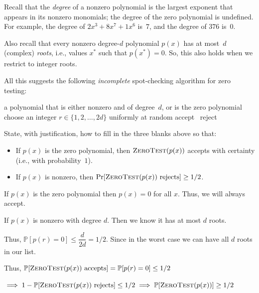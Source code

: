 \documentclass[12pt, letterpaper]{article}
\renewcommand{\P}{\mathbb{P}}
\renewcommand{\t}[1]{\text{#1}}
\begin{document}
\begin{subproblem}{}
    Recall that the \emph{degree} of a nonzero polynomial is the largest exponent that appears in its nonzero monomials; the degree of the zero polynomial is undefined.
    For example, the degree of $2x^3 + 8x^7 + 1x^6$ is~$7$, and the degree of $376$ is~$0$.

    Also recall that every nonzero degree-$d$ polynomial $p(x)$ has at most~$d$ (complex) \emph{roots}, i.e., values $x^*$ such that $p(x^*)=0$.
    So, this also holds when we restrict to integer roots.

    All this suggests the following \emph{incomplete} spot-checking algorithm for zero testing:

    \begin{minipage}{0.9\textwidth}
      \begin{algorithm}[H]
        \begin{algorithmic}[1]
          \Require a polynomial that is either nonzero and of degree~$d$, or is the zero polynomial
          \State choose an integer $r \in \{1,2,\ldots,2d\}$ uniformly at random
           accept
          \Else\ reject
          \EndIf
          \EndFunction
        \end{algorithmic}
      \end{algorithm}
    \end{minipage}
    
    State, with justification, how to fill in the three blanks above so that:
    \begin{itemize}
    \item If $p(x)$ is the zero polynomial, then $\Call{ZeroTest}{p(x)}$ accepts with certainty (i.e., with probability~$1$).
    \item If $p(x)$ is nonzero, then $\Pr[\Call{ZeroTest}{p(x)} \text{ rejects}] \geq 1/2$.
    \end{itemize}
\end{subproblem}
\begin{problemproof}
    If $p(x)$ is the zero polynomial then $p(x)=0$ for all $x$. Thus, we will always accept.

    If $p(x)$ is nonzero with degree $d$. Then we know it has at most $d$ roots. 
    
    Thus, $\P[p(r)=0] \leq \dfrac{d}{2d}=1/2$. Since in the worst case we can have all $d$ roots in our list.

    Thus, $\P[\Call{ZeroTest}{p(x)} \t{ accepts}]=\P[p(r)=0] \leq 1/2$ 
    
    $\implies 1-\P[\Call{ZeroTest}{p(x)} \t{ rejects}] \leq 1/2 \implies \P[\Call{ZeroTest}{p(x)}] \geq 1/2$
\end{problemproof}
\end{document}
